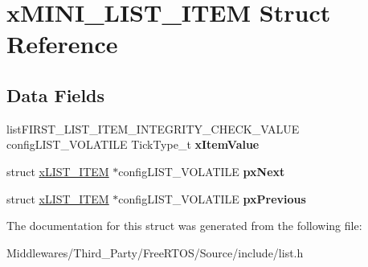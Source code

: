 \hypertarget{structx_m_i_n_i___l_i_s_t___i_t_e_m}{}\section{x\+M\+I\+N\+I\+\_\+\+L\+I\+S\+T\+\_\+\+I\+T\+EM Struct Reference}
\label{structx_m_i_n_i___l_i_s_t___i_t_e_m}
\subsection*{Data Fields}
\begin{DoxyCompactItemize}
\item 
\mbox{\label{structx_m_i_n_i___l_i_s_t___i_t_e_m_aa6f3caf3e73107fb0da6fede4b06f104}} 
list\+F\+I\+R\+S\+T\+\_\+\+L\+I\+S\+T\+\_\+\+I\+T\+E\+M\+\_\+\+I\+N\+T\+E\+G\+R\+I\+T\+Y\+\_\+\+C\+H\+E\+C\+K\+\_\+\+V\+A\+L\+UE config\+L\+I\+S\+T\+\_\+\+V\+O\+L\+A\+T\+I\+LE Tick\+Type\+\_\+t {\bfseries x\+Item\+Value}
\item 
\mbox{\label{structx_m_i_n_i___l_i_s_t___i_t_e_m_a77927cd93dda0c59b3855aca58881ca1}} 
struct \mbox{\hyperlink{structx_l_i_s_t___i_t_e_m}{x\+L\+I\+S\+T\+\_\+\+I\+T\+EM}} $\ast$config\+L\+I\+S\+T\+\_\+\+V\+O\+L\+A\+T\+I\+LE {\bfseries px\+Next}
\item 
\mbox{\label{structx_m_i_n_i___l_i_s_t___i_t_e_m_a0294e93ecc18bcdb723038af1027505d}} 
struct \mbox{\hyperlink{structx_l_i_s_t___i_t_e_m}{x\+L\+I\+S\+T\+\_\+\+I\+T\+EM}} $\ast$config\+L\+I\+S\+T\+\_\+\+V\+O\+L\+A\+T\+I\+LE {\bfseries px\+Previous}
\end{DoxyCompactItemize}


The documentation for this struct was generated from the following file\+:\begin{DoxyCompactItemize}
\item 
Middlewares/\+Third\+\_\+\+Party/\+Free\+R\+T\+O\+S/\+Source/include/list.\+h\end{DoxyCompactItemize}
